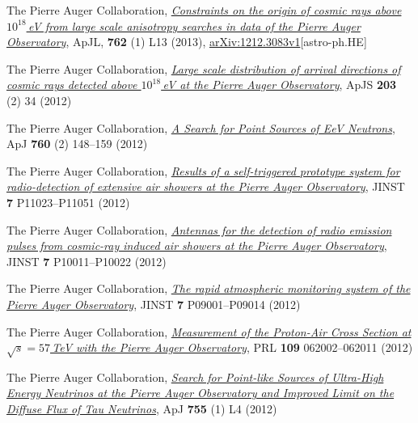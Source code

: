 \begin{etaremune}
\item {}The Pierre Auger Collaboration, \href{http://dx.doi.org/10.1088/2041-8205/762/1/L13}{\emph{Constraints on the origin of cosmic rays above $10^{18}$\,eV from large scale anisotropy searches in data of the Pierre Auger Observatory}}, ApJL, {\bf{762}} (1) L13 (2013), \href{http://arxiv.org/abs/1212.3083}{arXiv:1212.3083v1}[astro-ph.HE]

\item {}The Pierre Auger Collaboration,
\href{http://dx.doi.org/10.1088/0067-0049/203/2/34}{\emph{Large scale
distribution of arrival directions of cosmic rays detected above $10^{18}$\,eV
at the Pierre Auger Observatory}}, ApJS {\bf{203}} (2) 34 (2012)

\item {}The Pierre Auger Collaboration,
\href{http://dx.doi.org/10.1088/0004-637X/760/2/148}{\emph{A Search for Point
Sources of EeV Neutrons}}, ApJ {\bf{760}} (2) 148--159 (2012)

\item {}The Pierre Auger Collaboration,
\href{http://dx.doi.org/10.1088/1748-0221/7/11/P11023}{\emph{Results of a
self-triggered prototype system for radio-detection of extensive air showers at
the Pierre Auger Observatory}}, JINST {\bf{7}} P11023--P11051 (2012)

\item {}The Pierre Auger Collaboration,
\href{http://dx.doi.org/10.1088/1748-0221/7/10/P10011}{\emph{Antennas for the
detection of radio emission pulses from cosmic-ray induced air showers at the
Pierre Auger Observatory}}, JINST {\bf{7}} P10011--P10022 (2012)

\item {}The Pierre Auger Collaboration,
\href{http://dx.doi.org/10.1088/1748-0221/7/09/P09001}{\emph{The rapid
atmospheric monitoring system of the Pierre Auger Observatory}}, JINST
{\bf{7}} P09001--P09014 (2012)

\item {}The Pierre Auger Collaboration,
\href{http://dx.doi.org/10.1103/PhysRevLett.109.062002}{\emph{Measurement of
the Proton-Air Cross Section at $\sqrt{s}=57$\,TeV with the Pierre Auger
Observatory}}, PRL {\bf{109}} 062002--062011 (2012)

\item {}The Pierre Auger Collaboration,
\href{http://dx.doi.org/10.1088/2041-8205/755/1/L4}{\emph{Search for Point-like
Sources of Ultra-High Energy Neutrinos at the Pierre Auger Observatory and
Improved Limit on the Diffuse Flux of Tau Neutrinos}}, ApJ {\bf{755}} (1) L4
(2012)


\end{etaremune}
